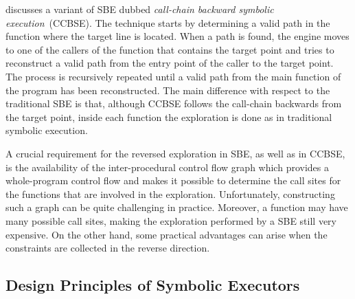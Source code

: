 \cite{MPF-SAS11} discusses a variant of SBE dubbed {\em call-chain backward symbolic execution}~(CCBSE). The technique starts by determining a valid path in the function where the target line is located. When a path is found, the engine moves to one of the callers of the function that contains the target point and tries to reconstruct a valid path from the entry point of the caller to the target point. The process is recursively repeated until a valid path from the main function of the program has been reconstructed. The main difference with respect to the traditional SBE is that, although CCBSE follows the call-chain backwards from the target point, inside each function the exploration is done as in traditional symbolic execution.


A crucial requirement for the reversed exploration in SBE, as well as in CCBSE, is the availability of the inter-procedural control flow graph which provides a whole-program control flow and makes it possible to determine the call sites for the functions that are involved in the exploration. Unfortunately, constructing such a graph can be quite challenging in practice. Moreover, a function may have many possible call sites, making the exploration performed by a SBE still very expensive. On the other hand, some practical advantages can arise when the constraints are collected in the reverse direction.


\vspace{-2mm}
\subsection{Design Principles of Symbolic Executors}
\label{ss:principles}


